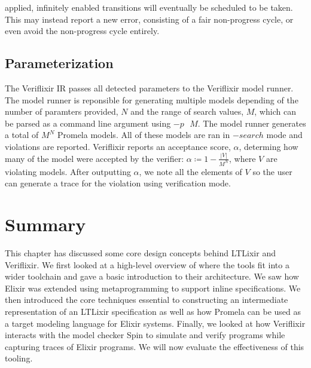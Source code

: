 applied, infinitely enabled transitions will eventually be scheduled to be taken. This may instead report a new error, consisting of a fair non-progress cycle, or even avoid the non-progress cycle entirely.  
\subsection{Parameterization}
The Veriflixir IR passes all detected parameters to the Veriflixir model runner. The model runner is reponsible for generating multiple models depending of the number of paramters provided, $N$ and the range of search values, $M$, which can be parsed as a command line argument using $-p\text{ }M$. The model runner generates a total of $M^N$ Promela models. All of these models are ran in $-search$ mode and violations are reported. Veriflixir reports an acceptance score, $\alpha$, determing how many of the model were accepted by the verifier: $\alpha \coloneq 1 - \frac{|V|}{M^N}$, where $V$ are violating models. After outputting $\alpha$, we note all the elements of $V$ so the user can generate a trace for the violation using verification mode.

\section{Summary}
This chapter has discussed some core design concepts behind LTLixir and Veriflixir. We first looked at a high-level overview of where the tools fit into a wider toolchain and gave a basic introduction to their architecture. We saw how Elixir was extended using metaprogramming to support inline specifications. We then introduced the core techniques essential to constructing an intermediate representation of an LTLixir specification as well as how Promela can be used as a target modeling language for Elixir systems. Finally, we looked at how Veriflixir interacts with the model checker Spin to simulate and verify programs while capturing traces of Elixir programs. We will now evaluate the effectiveness of this tooling.
